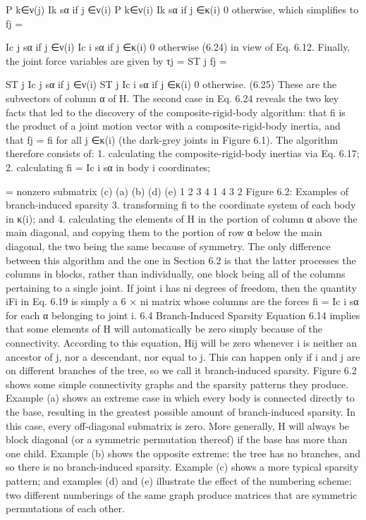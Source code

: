 P k∈ν(j) Ik sα if j ∈ν(i) P k∈ν(i) Ik sα if j ∈κ(i) 0 otherwise, which simplifies to fj =

Ic j sα if j ∈ν(i) Ic i sα if j ∈κ(i) 0 otherwise (6.24) in view of Eq. 6.12. Finally, the joint force variables are given by τj = ST j fj =

ST j Ic j sα if j ∈ν(i) ST j Ic i sα if j ∈κ(i) 0 otherwise. (6.25) These are the subvectors of column α of H. The second case in Eq. 6.24 reveals the two key facts that led to the discovery of the composite-rigid-body algorithm: that fi is the product of a joint motion vector with a composite-rigid-body inertia, and that fj = fi for all j ∈κ(i) (the dark-grey joints in Figure 6.1). The algorithm therefore consists of: 1. calculating the composite-rigid-body inertias via Eq. 6.17; 2. calculating fi = Ic i sα in body i coordinates;

= nonzero submatrix (c) (a) (b) (d) (e) 1 2 3 4 1 4 3 2 Figure 6.2: Examples of branch-induced sparsity 3. transforming fi to the coordinate system of each body in κ(i); and 4. calculating the elements of H in the portion of column α above the main diagonal, and copying them to the portion of row α below the main diagonal, the two being the same because of symmetry. The only difference between this algorithm and the one in Section 6.2 is that the latter processes the columns in blocks, rather than individually, one block being all of the columns pertaining to a single joint. If joint i has ni degrees of freedom, then the quantity iFi in Eq. 6.19 is simply a 6 × ni matrix whose columns are the forces fi = Ic i sα for each α belonging to joint i. 6.4 Branch-Induced Sparsity Equation 6.14 implies that some elements of H will automatically be zero simply because of the connectivity. According to this equation, Hij will be zero whenever i is neither an ancestor of j, nor a descendant, nor equal to j. This can happen only if i and j are on different branches of the tree, so we call it branch-induced sparsity. Figure 6.2 shows some simple connectivity graphs and the sparsity patterns they produce. Example (a) shows an extreme case in which every body is connected directly to the base, resulting in the greatest possible amount of branch-induced sparsity. In this case, every off-diagonal submatrix is zero. More generally, H will always be block diagonal (or a symmetric permutation thereof) if the base has more than one child. Example (b) shows the opposite extreme: the tree has no branches, and so there is no branch-induced sparsity. Example (c) shows a more typical sparsity pattern; and examples (d) and (e) illustrate the effect of the numbering scheme: two different numberings of the same graph produce matrices that are symmetric permutations of each other.

